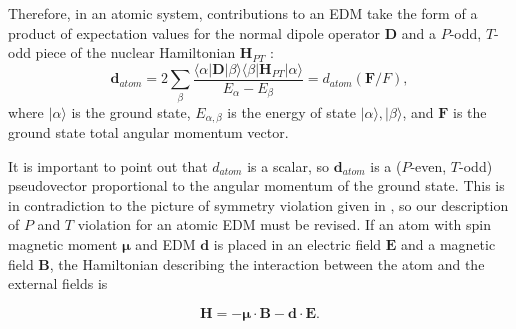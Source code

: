 \documentclass [10pt, twoside] {uwthesis}[2012/04/02]
\begin{document}
Therefore, in an atomic system, contributions to an EDM take the form of a product of expectation values for the normal dipole operator $\mathbf{D}$ and a $P$-odd, $T$-odd piece of the nuclear Hamiltonian $\mathbf{H}_{PT}$ \cite[eq. 123]{2004_Ginges_Flambaum_Fund._Symmetries_in_Atoms}: 
\begin{equation}\label{datom}
\mathbf{d}_{atom} = 2\sum_{\beta}\dfrac{\langle\alpha\vert\mathbf{D}\vert\beta\rangle\langle\beta\vert\mathbf{H}_{PT}\vert\alpha\rangle}{E_{\alpha}-E_{\beta}} = d_{atom}(\mathbf{F}/F),
\end{equation}
where $\vert\alpha\rangle$ is the ground state, $E_{\alpha,\beta}$ is the energy of state $\vert\alpha\rangle,\vert\beta\rangle$, and $\mathbf{F}$ is the ground state total angular momentum vector. 

It is important to point out that $d_{atom}$ is a scalar, so $\mathbf{d}_{atom}$ is a ($P$-even, $T$-odd) pseudovector proportional to the angular momentum of the ground state. This is in contradiction to the picture of symmetry violation given in \cite{1950_Purcell_Ramsey_EDM}, so our description of $P$ and $T$ violation for an atomic EDM must be revised. If an atom with spin magnetic moment $\boldsymbol\mu$ and EDM $\mathbf{d}$ is placed in an electric field $\mathbf{E}$ and a magnetic field $\mathbf{B}$, the Hamiltonian describing the interaction between the atom and the external fields is 

\begin{equation}\label{H}\mathbf{H} = -\boldsymbol\mu\cdot\mathbf{B} - \mathbf{d}\cdot\mathbf{E}.\end{equation}
\end{document}
